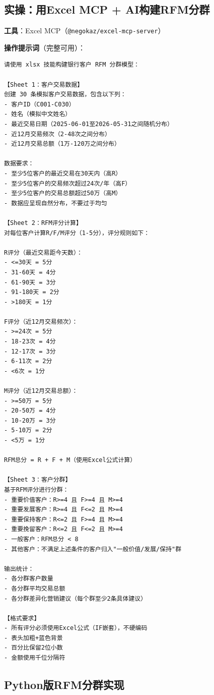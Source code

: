 \subsection{实操：用Excel MCP + AI构建RFM分群}

\begin{practicebox}[实操：RFM客户分群建模]
\textbf{工具}：Excel MCP（\texttt{@negokaz/excel-mcp-server}）

\textbf{操作提示词}（完整可用）：

\begin{lstlisting}
请使用 xlsx 技能构建银行客户 RFM 分群模型：

【Sheet 1：客户交易数据】
创建 30 条模拟客户交易数据，包含以下列：
- 客户ID（C001-C030）
- 姓名（模拟中文姓名）
- 最近交易日期（2025-06-01至2026-05-31之间随机分布）
- 近12月交易频次（2-48次之间分布）
- 近12月交易总额（1万-120万之间分布）

数据要求：
- 至少5位客户的最近交易在30天内（高R）
- 至少5位客户的交易频次超过24次/年（高F）
- 至少5位客户的交易总额超过50万（高M）
- 数据应呈现自然分布，不要过于均匀

【Sheet 2：RFM评分计算】
对每位客户计算R/F/M评分（1-5分），评分规则如下：

R评分（最近交易距今天数）：
- <=30天 = 5分
- 31-60天 = 4分
- 61-90天 = 3分
- 91-180天 = 2分
- >180天 = 1分

F评分（近12月交易频次）：
- >=24次 = 5分
- 18-23次 = 4分
- 12-17次 = 3分
- 6-11次 = 2分
- <6次 = 1分

M评分（近12月交易总额）：
- >=50万 = 5分
- 20-50万 = 4分
- 10-20万 = 3分
- 5-10万 = 2分
- <5万 = 1分

RFM总分 = R + F + M（使用Excel公式计算）

【Sheet 3：客户分群】
基于RFM评分进行分群：
- 重要价值客户：R>=4 且 F>=4 且 M>=4
- 重要发展客户：R>=4 且 F<=2 且 M>=4
- 重要保持客户：R<=2 且 F>=4 且 M>=4
- 重要挽留客户：R<=2 且 F<=2 且 M>=4
- 一般客户：RFM总分 < 8
- 其他客户：不满足上述条件的客户归入"一般价值/发展/保持"群

输出统计：
- 各分群客户数量
- 各分群平均交易总额
- 各分群差异化营销建议（每个群至少2条具体建议）

【格式要求】
- 所有评分必须使用Excel公式（IF嵌套），不硬编码
- 表头加粗+蓝色背景
- 百分比保留2位小数
- 金额使用千位分隔符
\end{lstlisting}
\end{practicebox}

\subsection{Python版RFM分群实现}

